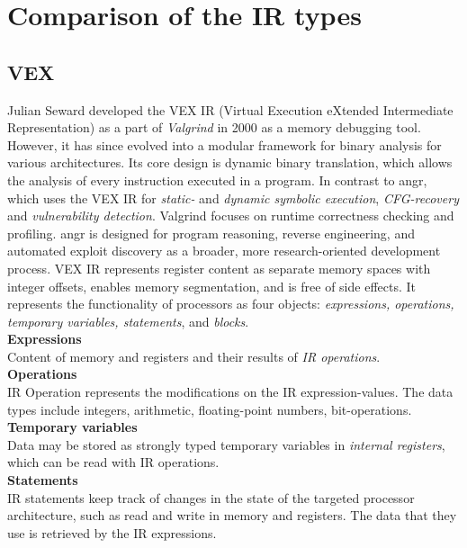 \documentclass[seminar]{plai}
\begin{document}
\section{Comparison of the IR types}
\label{sec:comparison-of-the-ir-types}

\subsection{VEX}
Julian Seward developed the VEX IR (Virtual Execution eXtended Intermediate Representation) as a part of \textit{Valgrind} in 2000 as a memory debugging tool. However, it has since evolved into a modular framework for binary analysis for various architectures. 
Its core design is dynamic binary translation, which allows the analysis of every instruction executed in a program. In contrast to angr, which uses the VEX IR for \textit{static-} and \textit{dynamic symbolic execution}, \textit{CFG-recovery} and \textit{vulnerability detection}.
Valgrind focuses on runtime correctness checking and profiling.
angr is designed for program reasoning, reverse engineering, and automated exploit discovery as a broader, more research-oriented development process. VEX IR represents register content as separate memory spaces with integer offsets, enables memory segmentation, and is free of side effects. It represents the functionality of processors as four objects: \textit{expressions, operations, temporary variables, statements}, and \textit{blocks}.\cite{Valgrind-A-Framework-for-Heavyweight-Dynamic-Binary-Instrumentation}\\

\noindent\textbf{Expressions}\\
Content of memory and registers and their results of \textit{IR operations}.\\

\noindent\textbf{Operations}\\
IR Operation represents the modifications on the IR expression-values.
The data types include integers, arithmetic, floating-point numbers, bit-operations.\\

\noindent\textbf{Temporary variables}\\
Data may be stored as strongly typed temporary variables in \textit{internal registers}, which can be read with IR operations.\\

\noindent\textbf{Statements}\\
IR statements keep track of changes in the state of the targeted processor architecture, such as read and write in memory and registers. The data that they use is retrieved by the IR expressions.\\
\end{document}
